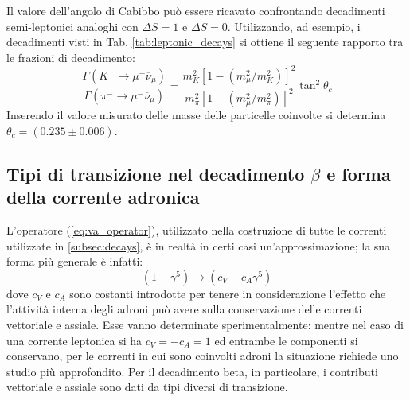 \documentclass{subnucbo}
\begin{document}
Il valore dell'angolo di Cabibbo può essere ricavato confrontando decadimenti semi-leptonici analoghi con $\Delta S = 1$ e $\Delta S = 0$. Utilizzando, ad esempio, i decadimenti visti in Tab. \ref{tab:leptonic_decays} si ottiene il seguente rapporto tra le frazioni di decadimento:
\begin{equation}
        \frac { \Gamma \left( K ^ { - } \rightarrow \mu ^ { - } \overline\nu _ { \mu } \right) } { \Gamma \left( \pi ^ { - } \rightarrow \mu ^ { - } \overline \nu _ { \mu } \right) } = \frac { m _ { K } ^ { 2 } \left[ 1 - \left( m _ { \mu } ^ { 2 } / m _ { K } ^ { 2 } \right) \right] ^ { 2 } } { m _ { \pi } ^ { 2 } \left[ 1 - \left( m _ { \mu } ^ { 2 } / m _ { \pi } ^ { 2 } \right) \right] ^ { 2 } } \tan ^ { 2 } \theta _ { c }
\end{equation}
Inserendo il valore misurato delle masse delle particelle coinvolte si determina $\theta_{c} = (0.235 \pm 0.006)$.

\subsection{Tipi di transizione nel decadimento $\beta$ e forma della corrente adronica}
L'operatore (\ref{eq:va_operator}), utilizzato nella costruzione di tutte le correnti utilizzate in \ref{subsec:decays}, è in realtà in certi casi un'approssimazione; la sua forma più generale è infatti:
\begin{equation}
        \left( 1 - \gamma ^ { 5 } \right) \rightarrow \left( c _ { V } - c _ { A } \gamma ^ { 5 } \right)
\end{equation}
dove $c_{V}$ e $c_{A}$ sono costanti introdotte per tenere in considerazione l'effetto che l'attività interna degli adroni può avere sulla conservazione delle correnti vettoriale e assiale. Esse vanno determinate sperimentalmente: mentre nel caso di una corrente leptonica si ha $c_{V}=-c_{A}=1$ ed entrambe le componenti si conservano, per le correnti in cui sono coinvolti adroni la situazione richiede uno studio più approfondito. Per il decadimento beta, in particolare, i contributi vettoriale e assiale sono dati da tipi diversi di transizione.
\end{document}
